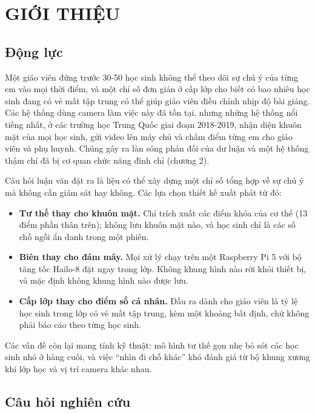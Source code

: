 \chapter{GIỚI THIỆU}

\section{Động lực}

Một giáo viên đứng trước 30-50 học sinh không thể theo dõi sự chú ý của từng em vào mọi thời điểm, và một chỉ số đơn giản ở cấp lớp cho biết có bao nhiêu học sinh đang có vẻ mất tập trung có thể giúp giáo viên điều chỉnh nhịp độ bài giảng. Các hệ thống dùng camera làm việc này đã tồn tại, nhưng những hệ thống nổi tiếng nhất, ở các trường học Trung Quốc giai đoạn 2018-2019, nhận diện khuôn mặt của mọi học sinh, gửi video lên máy chủ và chấm điểm từng em cho giáo viên và phụ huynh. Chúng gây ra làn sóng phản đối của dư luận và một hệ thống thậm chí đã bị cơ quan chức năng đình chỉ (chương 2).

Câu hỏi luận văn đặt ra là liệu có thể xây dựng một chỉ số tổng hợp về sự chú ý mà không cần giám sát hay không. Các lựa chọn thiết kế xuất phát từ đó:

\begin{itemize}
\tightlist
\item
  \textbf{Tư thế thay cho khuôn mặt.} Chỉ trích xuất các điểm khóa của cơ thể (13 điểm phần thân trên); không lưu khuôn mặt nào, và học sinh chỉ là các số chỗ ngồi ẩn danh trong một phiên.
\item
  \textbf{Biên thay cho đám mây.} Mọi xử lý chạy trên một Raspberry Pi 5 với bộ tăng tốc Hailo-8 đặt ngay trong lớp. Không khung hình nào rời khỏi thiết bị, và mặc định không khung hình nào được lưu.
\item
  \textbf{Cấp lớp thay cho điểm số cá nhân.} Đầu ra dành cho giáo viên là tỷ lệ học sinh trong lớp có vẻ mất tập trung, kèm một khoảng bất định, chứ không phải báo cáo theo từng học sinh.
\end{itemize}

Các vấn đề còn lại mang tính kỹ thuật: mô hình tư thế gọn nhẹ bỏ sót các học sinh nhỏ ở hàng cuối, và việc ``nhìn đi chỗ khác'' khó đánh giá từ bộ khung xương khi lớp học và vị trí camera khác nhau.

\section{Câu hỏi nghiên cứu}

